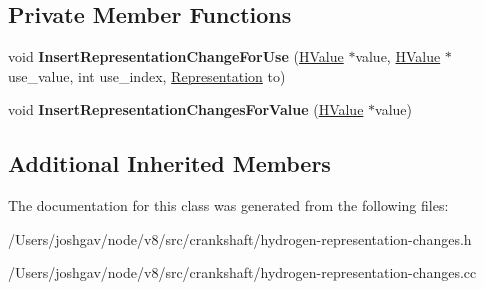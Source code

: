 \subsection*{Private Member Functions}
\begin{DoxyCompactItemize}
\item 
void {\bfseries Insert\+Representation\+Change\+For\+Use} (\hyperlink{classv8_1_1internal_1_1_h_value}{H\+Value} $\ast$value, \hyperlink{classv8_1_1internal_1_1_h_value}{H\+Value} $\ast$use\+\_\+value, int use\+\_\+index, \hyperlink{classv8_1_1internal_1_1_representation}{Representation} to)\hypertarget{classv8_1_1internal_1_1_h_representation_changes_phase_a1501434e896d6d412a6ac15fa2cffcb5}{}\label{classv8_1_1internal_1_1_h_representation_changes_phase_a1501434e896d6d412a6ac15fa2cffcb5}

\item 
void {\bfseries Insert\+Representation\+Changes\+For\+Value} (\hyperlink{classv8_1_1internal_1_1_h_value}{H\+Value} $\ast$value)\hypertarget{classv8_1_1internal_1_1_h_representation_changes_phase_adb9f687c8075287fd726180f5c61a7e2}{}\label{classv8_1_1internal_1_1_h_representation_changes_phase_adb9f687c8075287fd726180f5c61a7e2}

\end{DoxyCompactItemize}
\subsection*{Additional Inherited Members}


The documentation for this class was generated from the following files\+:\begin{DoxyCompactItemize}
\item 
/\+Users/joshgav/node/v8/src/crankshaft/hydrogen-\/representation-\/changes.\+h\item 
/\+Users/joshgav/node/v8/src/crankshaft/hydrogen-\/representation-\/changes.\+cc\end{DoxyCompactItemize}
